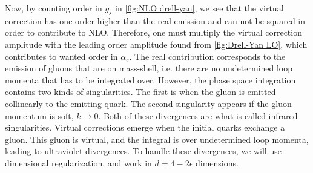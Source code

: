 Now, by counting order in $g_s$ in \cref{fig:NLO drell-yan}, we see that the virtual correction has one order higher than the real emission and can not be squared in order to contribute to NLO. Therefore, one must multiply the virtual correction amplitude with the leading order amplitude found from \cref{fig:Drell-Yan LO}, which contributes to wanted order in $\alpha_s$.
The real contribution corresponds to the emission of gluons that are on mass-shell, i.e. there are no undetermined loop momenta that has to be integrated over. However, the phase space integration contains two kinds of singularities. The first is when the gluon is emitted collinearly to the emitting quark. The second singularity appears if the gluon momentum is soft, $k\rightarrow 0$. Both of these divergences are what is called infrared-singularities. Virtual corrections emerge when the initial quarks exchange a gluon. This gluon is virtual, and the integral is over undetermined loop momenta, leading to ultraviolet-divergences. To handle these divergences, we will use dimensional regularization, and work in $d=4-2\epsilon$ dimensions.

